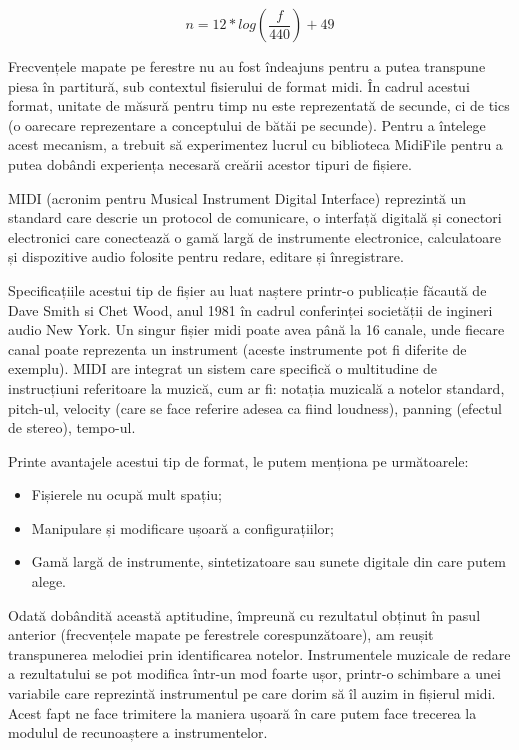 \documentclass[a4paper,12pt]{report}
\begin{document}
    \begin{equation}
    \label{freq_to_note}
    n = 12 * log(\dfrac{f}{440}) + 49
    \end{equation}

    Frecvențele mapate pe ferestre nu au fost îndeajuns pentru a putea transpune piesa în partitură, sub contextul fisierului de format midi. În cadrul acestui format, unitate de măsură pentru timp nu este reprezentată de secunde, ci de tics (o oarecare reprezentare a conceptului de bătăi pe secunde). Pentru a întelege acest mecanism, a trebuit să experimentez lucrul cu biblioteca MidiFile pentru a putea dobândi experiența necesară creării acestor tipuri de fișiere. 
    
    MIDI (acronim pentru Musical Instrument Digital Interface) reprezintă un standard care descrie un protocol de comunicare, o interfață digitală și conectori electronici care conectează o gamă largă de instrumente electronice, calculatoare și dispozitive audio folosite pentru redare, editare și înregistrare. 
    
    Specificațiile acestui tip de fișier au luat naștere printr-o publicație făcaută de Dave Smith si Chet Wood, anul 1981 în cadrul conferinței societății de ingineri audio New York. Un singur fișier midi poate avea până la 16 canale, unde fiecare canal poate reprezenta un instrument (aceste instrumente pot fi diferite de exemplu). MIDI are integrat un sistem care specifică o multitudine de instrucțiuni referitoare la muzică, cum ar fi: notația muzicală a notelor standard, pitch-ul, velocity (care se face referire adesea ca fiind loudness), panning (efectul de stereo), tempo-ul.
    
    Printe avantajele acestui tip de format, le putem menționa pe următoarele:
    \begin{itemize}
    	\item Fișierele nu ocupă mult spațiu;
    	\item Manipulare și modificare ușoară a configurațiilor;
    	\item Gamă largă de instrumente, sintetizatoare sau sunete digitale din care putem alege.
    \end{itemize} 
        
    Odată dobândită această aptitudine, împreună cu rezultatul obținut în pasul anterior (frecvențele mapate pe ferestrele corespunzătoare), am reușit transpunerea melodiei prin identificarea notelor. Instrumentele muzicale de redare a rezultatului se pot modifica într-un mod foarte ușor, printr-o schimbare a unei variabile care reprezintă instrumentul pe care dorim să îl auzim in fișierul midi. Acest fapt ne face trimitere la maniera ușoară în care putem face trecerea la modulul de recunoaștere a instrumentelor.
    
\end{document}
